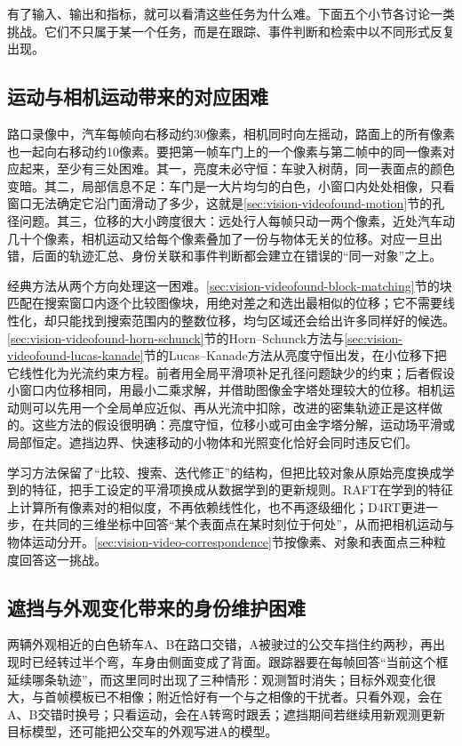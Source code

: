 有了输入、输出和指标，就可以看清这些任务为什么难。下面五个小节各讨论一类挑战。它们不只属于某一个任务，而是在跟踪、事件判断和检索中以不同形式反复出现。

\subsection{运动与相机运动带来的对应困难}
\label{sec:vision-video-challenge-motion}

路口录像中，汽车每帧向右移动约30像素，相机同时向左摇动，路面上的所有像素也一起向右移动约10像素。要把第一帧车门上的一个像素与第二帧中的同一像素对应起来，至少有三处困难。其一，亮度未必守恒：车驶入树荫，同一表面点的颜色变暗。其二，局部信息不足：车门是一大片均匀的白色，小窗口内处处相像，只看窗口无法确定它沿门面滑动了多少，这就是\ref{sec:vision-videofound-motion}节的孔径问题。其三，位移的大小跨度很大：远处行人每帧只动一两个像素，近处汽车动几十个像素，相机运动又给每个像素叠加了一份与物体无关的位移。对应一旦出错，后面的轨迹汇总、身份关联和事件判断都会建立在错误的“同一对象”之上。

经典方法从两个方向处理这一困难。\ref{sec:vision-videofound-block-matching}节的块匹配在搜索窗口内逐个比较图像块，用绝对差之和选出最相似的位移；它不需要线性化，却只能找到搜索范围内的整数位移，均匀区域还会给出许多同样好的候选。\ref{sec:vision-videofound-horn-schunck}节的Horn--Schunck方法与\ref{sec:vision-videofound-lucas-kanade}节的Lucas--Kanade方法从亮度守恒出发，在小位移下把它线性化为光流约束方程。前者用全局平滑项补足孔径问题缺少的约束；后者假设小窗口内位移相同，用最小二乘求解，并借助图像金字塔处理较大的位移。相机运动则可以先用一个全局单应近似、再从光流中扣除，改进的密集轨迹正是这样做的。这些方法的假设很明确：亮度守恒，位移小或可由金字塔分解，运动场平滑或局部恒定。遮挡边界、快速移动的小物体和光照变化恰好会同时违反它们。

学习方法保留了“比较、搜索、迭代修正”的结构，但把比较对象从原始亮度换成学到的特征，把手工设定的平滑项换成从数据学到的更新规则。RAFT在学到的特征上计算所有像素对的相似度，不再依赖线性化，也不再逐级细化；D4RT更进一步，在共同的三维坐标中回答“某个表面点在某时刻位于何处”，从而把相机运动与物体运动分开。\ref{sec:vision-video-correspondence}节按像素、对象和表面点三种粒度回答这一挑战。

\subsection{遮挡与外观变化带来的身份维护困难}
\label{sec:vision-video-challenge-identity}

两辆外观相近的白色轿车A、B在路口交错，A被驶过的公交车挡住约两秒，再出现时已经转过半个弯，车身由侧面变成了背面。跟踪器要在每帧回答“当前这个框延续哪条轨迹”，而这里同时出现了三种情形：观测暂时消失；目标外观变化很大，与首帧模板已不相像；附近恰好有一个与之相像的干扰者。只看外观，会在A、B交错时换号；只看运动，会在A转弯时跟丢；遮挡期间若继续用新观测更新目标模型，还可能把公交车的外观写进A的模型。


